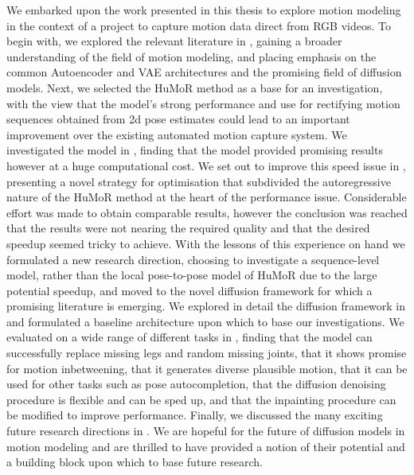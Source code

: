 We embarked upon the work presented in this thesis to explore motion modeling in the context of a project to capture motion data direct from RGB videos. To begin with, we explored the relevant literature in , gaining a broader understanding of the field of motion modeling, and placing emphasis on the common Autoencoder and VAE architectures and the promising field of diffusion models. Next, we selected the HuMoR method \cite{humor} as a base for an investigation, with the view that the model's strong performance and use for rectifying motion sequences obtained from 2d pose estimates could lead to an important improvement over the existing automated motion capture system. We investigated the model in , finding that the model provided promising results however at a huge computational cost. We set out to improve this speed issue in , presenting a novel strategy for optimisation that subdivided the autoregressive nature of the HuMoR method at the heart of the performance issue. Considerable effort was made to obtain comparable results, however the conclusion was reached that the results were not nearing the required quality and that the desired speedup seemed tricky to achieve. With the lessons of this experience on hand we formulated a new research direction, choosing to investigate a sequence-level model, rather than the local pose-to-pose model of HuMoR due to the large potential speedup, and moved to the novel diffusion framework for which a promising literature is emerging. We explored in detail the diffusion framework in  and formulated a baseline architecture upon which to base our investigations. We evaluated on a wide range of different tasks in , finding that the model can successfully replace missing legs and random missing joints, that it shows promise for motion inbetweening, that it generates diverse plausible motion, that it can be used for other tasks such as pose autocompletion, that the diffusion denoising procedure is flexible and can be sped up, and that the inpainting procedure can be modified to improve performance. Finally, we discussed the many exciting future research directions in . We are hopeful for the future of diffusion models in motion modeling and are thrilled to have provided a notion of their potential and a building block upon which to base future research.